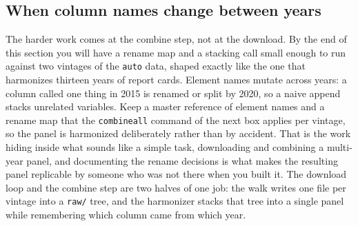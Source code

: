 \subsection{When column names change between years}\label{sec:ch04-combine}
The harder work comes at the combine step, not at the download. By the end of this section you will have a rename map and a stacking call small enough to run against two vintages of the \texttt{auto} data, shaped exactly like the one that harmonizes thirteen years of report cards. Element names mutate across years: a column called one thing in 2015 is renamed or split by 2020, so a naive append stacks unrelated variables. Keep a master reference of element names and a rename map that the \texttt{combineall} command of the next box applies per vintage, so the panel is harmonized deliberately rather than by accident. That is the work hiding inside what sounds like a simple task, downloading and combining a multi-year panel, and documenting the rename decisions is what makes the resulting panel replicable by someone who was not there when you built it. The download loop and the combine step are two halves of one job: the walk writes one file per vintage into a \texttt{raw/} tree, and the harmonizer stacks that tree into a single panel while remembering which column came from which year.

